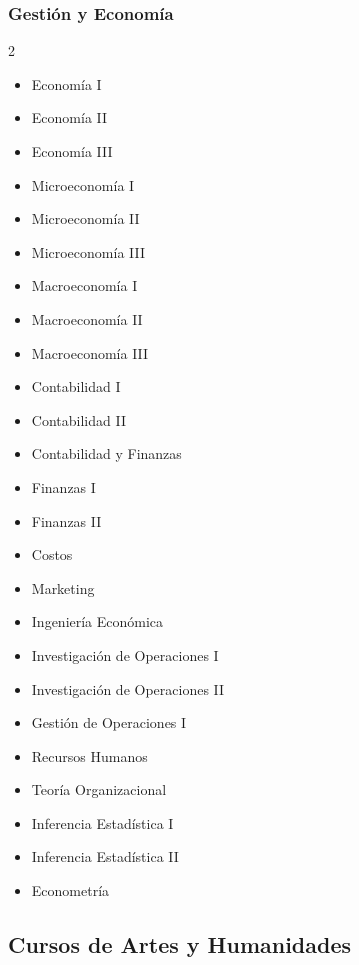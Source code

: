 \documentclass[12pt,a4paper]{article}
\begin{document}
	\subsubsection{Gestión y Economía}
	\begin{multicols}{2}
		\begin{itemize}
			\item Economía I
			\item Economía II
			\item Economía III
			\item Microeconomía I
			\item Microeconomía II
			\item Microeconomía III
			\item Macroeconomía I
			\item Macroeconomía II
			\item Macroeconomía III
			\item Contabilidad I
			\item Contabilidad II
			\item Contabilidad y Finanzas
			\item Finanzas I
			\item Finanzas II
			\item Costos
			\item Marketing
			\item Ingeniería Económica
			\item Investigación de Operaciones I
			\item Investigación de Operaciones II
			\item Gestión de Operaciones I
			\item Recursos Humanos
			\item Teoría Organizacional
			\item Inferencia Estadística I
			\item Inferencia Estadística II
			\item Econometría
		\end{itemize}
	\end{multicols}
	
	\subsection{Cursos de Artes y Humanidades}
	
\end{document}
